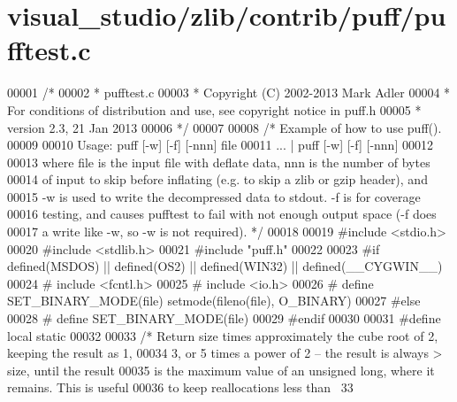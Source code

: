 \hypertarget{visual__studio_2zlib_2contrib_2puff_2pufftest_8c_source}{}\section{visual\+\_\+studio/zlib/contrib/puff/pufftest.c}
\label{visual__studio_2zlib_2contrib_2puff_2pufftest_8c_source}

\begin{DoxyCode}
00001 \textcolor{comment}{/*}
00002 \textcolor{comment}{ * pufftest.c}
00003 \textcolor{comment}{ * Copyright (C) 2002-2013 Mark Adler}
00004 \textcolor{comment}{ * For conditions of distribution and use, see copyright notice in puff.h}
00005 \textcolor{comment}{ * version 2.3, 21 Jan 2013}
00006 \textcolor{comment}{ */}
00007 
00008 \textcolor{comment}{/* Example of how to use puff().}
00009 \textcolor{comment}{}
00010 \textcolor{comment}{   Usage: puff [-w] [-f] [-nnn] file}
00011 \textcolor{comment}{          ... | puff [-w] [-f] [-nnn]}
00012 \textcolor{comment}{}
00013 \textcolor{comment}{   where file is the input file with deflate data, nnn is the number of bytes}
00014 \textcolor{comment}{   of input to skip before inflating (e.g. to skip a zlib or gzip header), and}
00015 \textcolor{comment}{   -w is used to write the decompressed data to stdout.  -f is for coverage}
00016 \textcolor{comment}{   testing, and causes pufftest to fail with not enough output space (-f does}
00017 \textcolor{comment}{   a write like -w, so -w is not required). */}
00018 
00019 \textcolor{preprocessor}{#include <stdio.h>}
00020 \textcolor{preprocessor}{#include <stdlib.h>}
00021 \textcolor{preprocessor}{#include "puff.h"}
00022 
00023 \textcolor{preprocessor}{#if defined(MSDOS) || defined(OS2) || defined(WIN32) || defined(\_\_CYGWIN\_\_)}
00024 \textcolor{preprocessor}{#  include <fcntl.h>}
00025 \textcolor{preprocessor}{#  include <io.h>}
00026 \textcolor{preprocessor}{#  define SET\_BINARY\_MODE(file) setmode(fileno(file), O\_BINARY)}
00027 \textcolor{preprocessor}{#else}
00028 \textcolor{preprocessor}{#  define SET\_BINARY\_MODE(file)}
00029 \textcolor{preprocessor}{#endif}
00030 
00031 \textcolor{preprocessor}{#define local static}
00032 
00033 \textcolor{comment}{/* Return size times approximately the cube root of 2, keeping the result as 1,}
00034 \textcolor{comment}{   3, or 5 times a power of 2 -- the result is always > size, until the result}
00035 \textcolor{comment}{   is the maximum value of an unsigned long, where it remains.  This is useful}
00036 \textcolor{comment}{   to keep reallocations less than ~33%
}
\end{DoxyCode}
